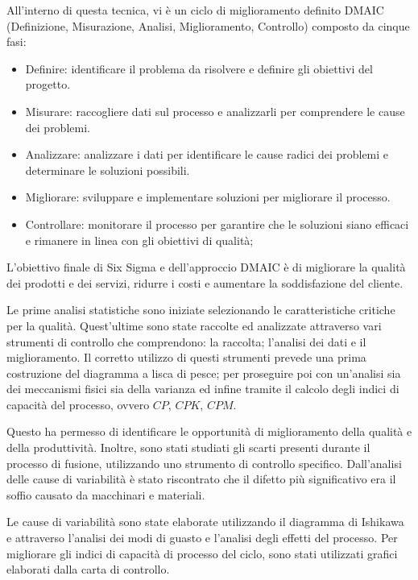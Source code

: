 All'interno di questa tecnica, vi è un ciclo di miglioramento definito DMAIC (Definizione, Misurazione, Analisi, Miglioramento, Controllo) composto da cinque fasi:
\begin{itemize}
    \item Definire: identificare il problema da risolvere e definire gli obiettivi del progetto.
    \item Misurare: raccogliere dati sul processo e analizzarli per comprendere le cause dei problemi.
    \item Analizzare: analizzare i dati per identificare le cause radici dei problemi e determinare le soluzioni possibili.
    \item Migliorare: sviluppare e implementare soluzioni per migliorare il processo.
    \item Controllare: monitorare il processo per garantire che le soluzioni siano efficaci e rimanere in linea con gli obiettivi di qualità;
\end{itemize}

L'obiettivo finale di Six Sigma e dell'approccio DMAIC è di migliorare la qualità dei prodotti e dei servizi, ridurre i costi e aumentare la soddisfazione del cliente.
\cite{LeanSixSigma}


Le prime analisi statistiche sono iniziate selezionando le caratteristiche critiche per la qualità. 
Quest'ultime sono state raccolte ed analizzate attraverso vari strumenti di controllo che comprendono: la raccolta; l'analisi dei dati e il miglioramento.
Il corretto utilizzo di questi strumenti prevede una prima costruzione del diagramma a lisca di pesce; per proseguire poi con un'analisi sia dei meccanismi fisici sia della varianza ed infine tramite il calcolo degli indici di capacità del processo, ovvero $CP$, $CPK$, $CPM$.


Questo ha permesso di identificare le opportunità di miglioramento della qualità e della produttività. Inoltre, sono stati studiati gli scarti presenti durante il processo di fusione, utilizzando uno strumento di controllo specifico.
Dall'analisi delle cause di variabilità è stato riscontrato che il difetto più significativo era il soffio causato da macchinari e materiali.

 Le cause di variabilità sono state elaborate utilizzando il diagramma di Ishikawa e attraverso l'analisi dei modi di guasto e l'analisi degli effetti del processo.
 Per migliorare gli indici di capacità di processo del ciclo, sono stati utilizzati grafici elaborati dalla carta di controllo.



